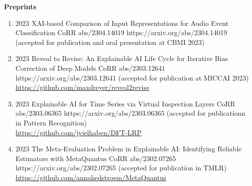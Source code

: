 \headedsection %
{\bf Preprints}{}
{
    \begin{enumerate}

        \item {}
                        {2023}
                        {XAI-based Comparison of Input Representations for Audio Event Classification}
                        {CoRR abs/2304.14019}
                        {https://arxiv.org/abs/2304.14019}
                        {(accepted for publication and oral presentation at CBMI 2023)}
                
        \item {}
                        {2023}
                        {Reveal to Revise: An Explainable AI Life Cycle for Iterative Bias Correction of Deep Models}
                        {CoRR abs/2303.12641}
                        {https://arxiv.org/abs/2303.12641}
                        {(accepted for publication at MICCAI 2023)\\ \href{https://github.com/maxdreyer/reveal2revise}{https://github.com/maxdreyer/reveal2revise}}
        
        \item {}
                        {2023}
                        {Explainable AI for Time Series via Virtual Inspection Layers}
                        {CoRR abs/2303.06365}
                        {https://arxiv.org/abs/2303.06365}
                        {(accepted for publicationn in Pattern Recognition)\\ \href{https://github.com/jvielhaben/DFT-LRP}{https://github.com/jvielhaben/DFT-LRP}}

        \item {}
                        {2023}
                        {The Meta-Evaluation Problem in Explainable AI: Identifying Reliable Estimators with MetaQuantus}
                        {CoRR abs/2302.07265}
                        {https://arxiv.org/abs/2302.07265}
                        {(accepted for publication in TMLR)\\ \href{https://github.com/annahedstroem/MetaQuantus}{https://github.com/annahedstroem/MetaQuantus}}


\end{enumerate}}
